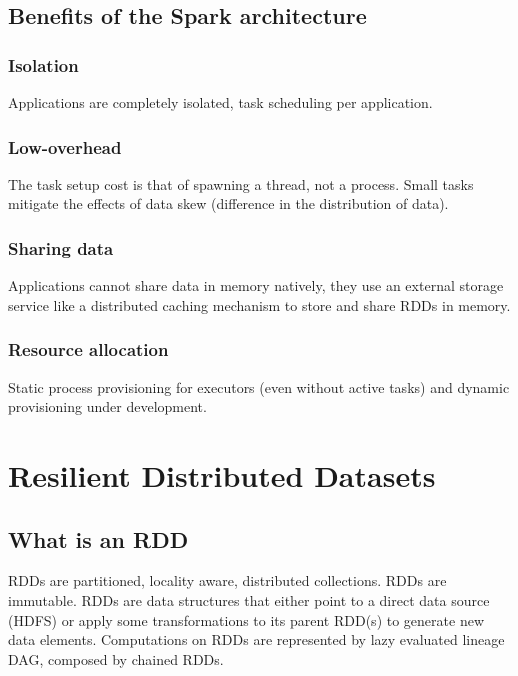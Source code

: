 	\subsection{Benefits of the Spark architecture}
		\subsubsection{Isolation}
			\par
			Applications are completely isolated, task scheduling per application.
		\subsubsection{Low-overhead}
			\par
			The task setup cost is that of spawning a thread, not a process. Small tasks mitigate the effects of data skew (difference in the distribution of data).
		\subsubsection{Sharing data}
			\par
			Applications cannot share data in memory natively, they use an external storage service like a distributed caching mechanism to store and share RDDs in memory.
		\subsubsection{Resource allocation}
			\par
			Static process provisioning for executors (even without active tasks) and dynamic provisioning under development.
			
\section{Resilient Distributed Datasets}
	\subsection{What is an RDD}
		\par
		RDDs are partitioned, locality aware, distributed collections. RDDs are immutable.
		\newline
		RDDs are data structures that either point to a direct data source (HDFS) or apply some transformations to its parent RDD(s) to generate new data elements.
		\newline
		Computations on RDDs are represented by lazy evaluated lineage DAG, composed by chained RDDs.
